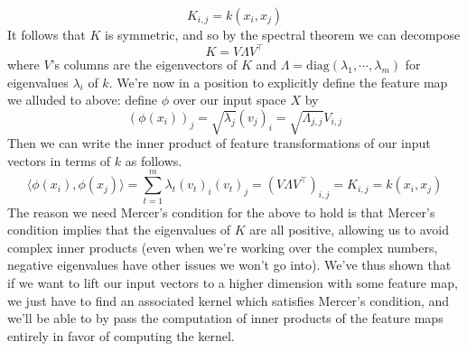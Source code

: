 \documentclass{article}
\begin{document}
$$ K_{i, j} = k(x_i, x_j) $$
It follows that $ K $ is symmetric, and so by the spectral theorem we can decompose
$$ K = V \Lambda V^\intercal $$
where $ V $'s columns are the eigenvectors of $ K $ and $ \Lambda = \text{diag}(\lambda_1, \cdots, \lambda_m) $ for eigenvalues $ \lambda_i $ of $ k $. We're now in a position to explicitly define the feature map we alluded to above: define $ \phi $ over our input space $ X $ by
$$ (\phi(x_i))_j = \sqrt{\lambda_j} (v_j)_i = \sqrt{\Lambda_{j, j}} V_{i, j} $$
Then we can write the inner product of feature transformations of our input vectors in terms of $ k $ as follows.
$$ \langle \phi(x_i), \phi(x_j) \rangle = \sum_{t = 1}^m \lambda_t (v_t)_i (v_t)_j = (V \Lambda V^\intercal)_{i, j} = K_{i, j} = k(x_i, x_j) $$
The reason we need Mercer's condition for the above to hold is that Mercer's condition implies that the eigenvalues of $ K $ are all positive, allowing us to avoid complex inner products (even when we're working over the complex numbers, negative eigenvalues have other issues we won't go into).
\newline \newline
We've thus shown that if we want to lift our input vectors to a higher dimension with some feature map, we just have to find an associated kernel which satisfies Mercer's condition, and we'll be able to by pass the computation of inner products of the feature maps entirely in favor of computing the kernel.
\end{document}
